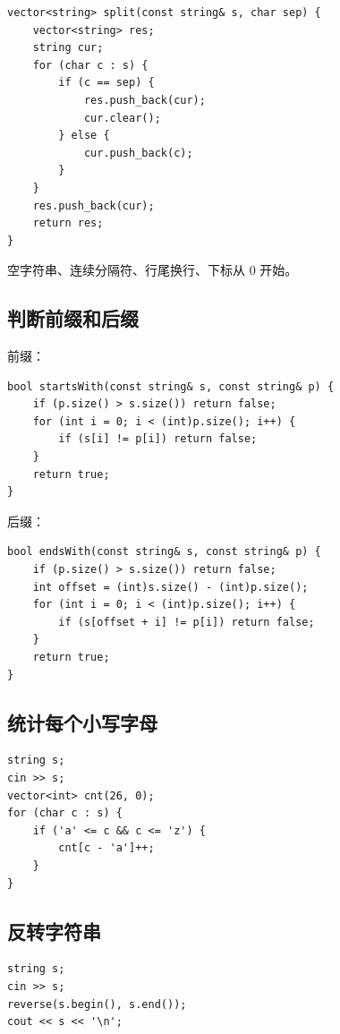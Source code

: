 \begin{lstlisting}
vector<string> split(const string& s, char sep) {
    vector<string> res;
    string cur;
    for (char c : s) {
        if (c == sep) {
            res.push_back(cur);
            cur.clear();
        } else {
            cur.push_back(c);
        }
    }
    res.push_back(cur);
    return res;
}
\end{lstlisting}

空字符串、连续分隔符、行尾换行、下标从 0 开始。

\subsection{判断前缀和后缀}

前缀：

\begin{lstlisting}
bool startsWith(const string& s, const string& p) {
    if (p.size() > s.size()) return false;
    for (int i = 0; i < (int)p.size(); i++) {
        if (s[i] != p[i]) return false;
    }
    return true;
}
\end{lstlisting}

后缀：

\begin{lstlisting}
bool endsWith(const string& s, const string& p) {
    if (p.size() > s.size()) return false;
    int offset = (int)s.size() - (int)p.size();
    for (int i = 0; i < (int)p.size(); i++) {
        if (s[offset + i] != p[i]) return false;
    }
    return true;
}
\end{lstlisting}

\subsection{统计每个小写字母}

\begin{lstlisting}
string s;
cin >> s;
vector<int> cnt(26, 0);
for (char c : s) {
    if ('a' <= c && c <= 'z') {
        cnt[c - 'a']++;
    }
}
\end{lstlisting}

\subsection{反转字符串}

\begin{lstlisting}
string s;
cin >> s;
reverse(s.begin(), s.end());
cout << s << '\n';
\end{lstlisting}


